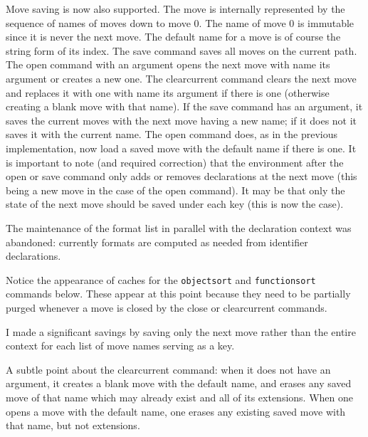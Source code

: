 \documentclass[12pt]{article}
\begin{document}
Move saving is now also supported.  The move is internally represented by the sequence of names of moves down to move 0.  The name of move 0 is immutable
since it is never the next move.  The default name for a move is of course the string form of its index.  The save command saves all moves on the current path.
The open command with an argument opens the next move with name its argument or creates a new one.  The clearcurrent command clears the next move
and replaces it with one with name its argument if there is one (otherwise creating a blank move with that name).   If the save command
has an argument, it saves the current moves with the next move having a new name;  if it does not it saves it with the current name.  The open command
does, as in the previous implementation, now load a saved move with the default name if there is one.  It is important to note (and required correction) that
the environment after the open or save command only adds or removes declarations at the next move (this being a new move in the case of the
open command).  It may be that only the state of the next move should be saved under each key (this is now the case).

The maintenance of the format list in parallel with the declaration context was abandoned:  currently formats are computed as needed from identifier declarations. 

Notice the appearance of caches for the {\tt objectsort} and {\tt functionsort} commands below. These appear at this point because they need to be partially purged
whenever a move is closed by the close or clearcurrent commands.

I made a significant savings by saving only the next move rather than the entire context for each list of move names serving as a key.

A subtle point about the clearcurrent command:  when it does not have an argument, it creates a blank move with the default name, and erases any saved  move of that name
which may already exist and all of its extensions.  When one opens a move with the default name, one erases any existing saved move with that name, but not extensions.

\newpage
\end{document}
